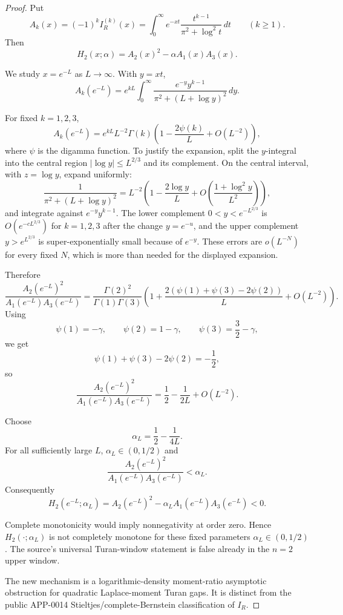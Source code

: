 \begin{proof}
Put
\[
A_k(x)=(-1)^k I_R^{(k)}(x)
=\int_0^\infty e^{-xt}\frac{t^{k-1}}{\pi^2+\log^2 t}\,dt
\qquad (k\ge1).
\]
Then
\[
H_2(x;\alpha)=A_2(x)^2-\alpha A_1(x)A_3(x).
\]

We study \(x=e^{-L}\) as \(L\to\infty\). With \(y=xt\),
\[
A_k(e^{-L})
=
e^{kL}\int_0^\infty
\frac{e^{-y}y^{k-1}}
{\pi^2+(L+\log y)^2}\,dy.
\]

For fixed \(k=1,2,3\),
\[
A_k(e^{-L})
=
e^{kL}L^{-2}\Gamma(k)
\left(1-\frac{2\psi(k)}{L}+O(L^{-2})\right),
\]
where \(\psi\) is the digamma function. To justify the expansion, split the \(y\)-integral into the central region \(|\log y|\le L^{2/3}\) and its complement. On the central interval, with \(z=\log y\), expand uniformly:
\[
\frac{1}{\pi^2+(L+\log y)^2}
=
L^{-2}\left(1-\frac{2\log y}{L}+O\left(\frac{1+\log^2 y}{L^2}\right)\right),
\]
and integrate against \(e^{-y}y^{k-1}\). The lower complement \(0<y<e^{-L^{2/3}}\) is \(O(e^{-cL^{2/3}})\) for \(k=1,2,3\) after the change \(y=e^{-u}\), and the upper complement \(y>e^{L^{2/3}}\) is super-exponentially small because of \(e^{-y}\). These errors are \(o(L^{-N})\) for every fixed \(N\), which is more than needed for the displayed expansion.

Therefore
\[
\frac{A_2(e^{-L})^2}{A_1(e^{-L})A_3(e^{-L})}
=
\frac{\Gamma(2)^2}{\Gamma(1)\Gamma(3)}
\left(
1+\frac{2(\psi(1)+\psi(3)-2\psi(2))}{L}+O(L^{-2})
\right).
\]
Using
\[
\psi(1)=-\gamma,\qquad
\psi(2)=1-\gamma,\qquad
\psi(3)=\frac32-\gamma,
\]
we get
\[
\psi(1)+\psi(3)-2\psi(2)=-\frac12,
\]
so
\[
\frac{A_2(e^{-L})^2}{A_1(e^{-L})A_3(e^{-L})}
=
\frac12-\frac{1}{2L}+O(L^{-2}).
\]

Choose
\[
\alpha_L=\frac12-\frac{1}{4L}.
\]
For all sufficiently large \(L\), \(\alpha_L\in(0,1/2)\) and
\[
\frac{A_2(e^{-L})^2}{A_1(e^{-L})A_3(e^{-L})}<\alpha_L.
\]
Consequently
\[
H_2(e^{-L};\alpha_L)
=
A_2(e^{-L})^2-\alpha_L A_1(e^{-L})A_3(e^{-L})
<0.
\]

Complete monotonicity would imply nonnegativity at order zero. Hence \(H_2(\cdot;\alpha_L)\) is not completely monotone for these fixed parameters \(\alpha_L\in(0,1/2)\). The source's universal Turan-window statement is false already in the \(n=2\) upper window.

The new mechanism is a logarithmic-density moment-ratio asymptotic obstruction for quadratic Laplace-moment Turan gaps. It is distinct from the public APP-0014 Stieltjes/complete-Bernstein classification of \(I_R\).
\end{proof}


